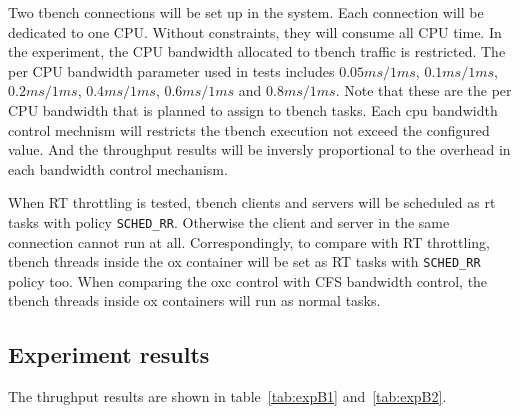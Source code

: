 Two tbench connections will be set up in the system.
Each connection will be dedicated to one CPU.
Without constraints, they will consume all CPU time.
In the experiment, the CPU bandwidth allocated to tbench traffic is restricted.
The per CPU bandwidth parameter used in tests includes
$0.05ms/1ms$, $0.1ms/1ms$, $0.2ms/1ms$, $0.4ms/1ms$, $0.6ms/1ms$ and 
$0.8ms/1ms$. 
Note that these are the per CPU bandwidth that is planned to assign to 
tbench tasks. Each cpu bandwidth control mechnism will restricts the 
tbench execution not exceed the configured value. And the throughput 
results will be inversly proportional to the overhead in each bandwidth 
control mechanism.

When RT throttling is tested, tbench clients and servers will be 
scheduled as rt tasks with policy \texttt{SCHED\_RR}. Otherwise the client 
and server in the same connection cannot run at all. Correspondingly, to 
compare with RT throttling, tbench threads inside the ox container will 
be set as RT tasks with \texttt{SCHED\_RR} policy too. 
When comparing the oxc control with CFS bandwidth control, the tbench
threads inside ox containers will run as normal tasks. 

\subsection{Experiment results}

The thrughput results are shown in table~\ref{tab:expB1} and~\ref{tab:expB2}.

